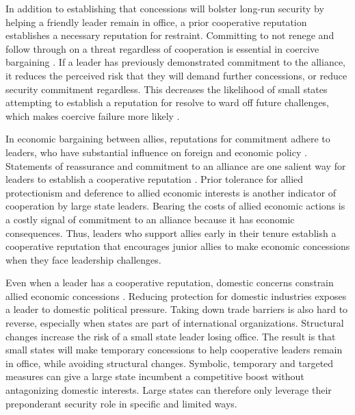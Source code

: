 \documentclass[12pt]{article}
\begin{document}
In addition to establishing that concessions will bolster long-run security by helping a friendly leader remain in office, a prior cooperative reputation establishes a necessary reputation for restraint. 
Committing to not renege and follow through on a threat regardless of cooperation is essential in coercive bargaining \citep{Cebuletal2021}. 
If a leader has previously demonstrated commitment to the alliance, it reduces the perceived risk that they will demand further concessions, or reduce security commitment regardless.
This decreases the likelihood of small states attempting to establish a reputation for resolve to ward off future challenges, which makes coercive failure more likely \citep{Sechser2010, Sechser2018}. 


In economic bargaining between allies, reputations for commitment adhere to leaders, who have substantial influence on foreign and economic policy \citep{Renshonetal2018}.
Statements of reassurance and commitment to an alliance are one salient way for leaders to establish a cooperative reputation \citep{Blankenship2020}.
Prior tolerance for allied protectionism and deference to allied economic interests is another indicator of cooperation by large state leaders.
Bearing the costs of allied economic actions is a costly signal of commitment to an alliance because it has economic consequences. 
Thus, leaders who support allies early in their tenure establish a cooperative reputation that encourages junior allies to make economic concessions when they face leadership challenges.


Even when a leader has a cooperative reputation, domestic concerns constrain allied economic concessions \citep{Davis2008}. 
Reducing protection for domestic industries exposes a leader to domestic political pressure. 
Taking down trade barriers is also hard to reverse, especially when states are part of international organizations.
Structural changes increase the risk of a small state leader losing office.  
The result is that small states will make temporary concessions to help cooperative leaders remain in office, while avoiding structural changes. 
Symbolic, temporary and targeted measures can give a large state incumbent a competitive boost without antagonizing domestic interests. 
Large states can therefore only leverage their preponderant security role in specific and limited ways.
\end{document}
